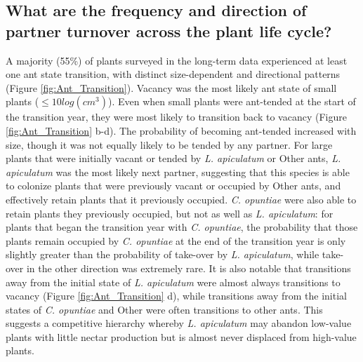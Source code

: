 \documentclass[11pt]{article}
\begin{document}
\subsection*{What are the frequency and direction of partner turnover across the plant life cycle?}
A majority (55\%) of plants surveyed in the long-term data experienced at least one ant state transition, with distinct size-dependent and directional patterns (Figure \ref{fig:Ant_Transition}). 
Vacancy was the most likely ant state of small plants ($\leq 10 log(cm^3)$).
Even when small plants were ant-tended at the start of the transition year, they were most likely to transition back to vacancy (Figure \ref{fig:Ant_Transition} b-d). 
The probability of becoming ant-tended increased with size, though it was not equally likely to be tended by any partner.  
For large plants that were initially vacant or tended by \textit{L. apiculatum} or Other ants, \textit{L. apiculatum} was the most likely next partner, suggesting that this species is able to colonize plants that were previously vacant or occupied by Other ants, and effectively retain plants that it previously occupied.  
\textit{C. opuntiae} were also able to retain plants they previously occupied, but not as well as \textit{L. apiculatum}: for plants that began the transition year with \textit{C. opuntiae}, the probability that those plants remain occupied by \textit{C. opuntiae} at the end of the transition year is only slightly greater than the probability of take-over by \textit{L. apiculatum}, while take-over in the other direction was extremely rare. 
It is also notable that transitions away from the initial state of \textit{L. apiculatum} were almost always transitions to vacancy (Figure \ref{fig:Ant_Transition} d), while transitions away from the initial states of \textit{C. opuntiae} and Other  were often transitions to other ants. 
This suggests a competitive hierarchy whereby \textit{L. apiculatum} may abandon low-value plants with little nectar production but is almost never displaced from high-value plants. 
\end{document}
